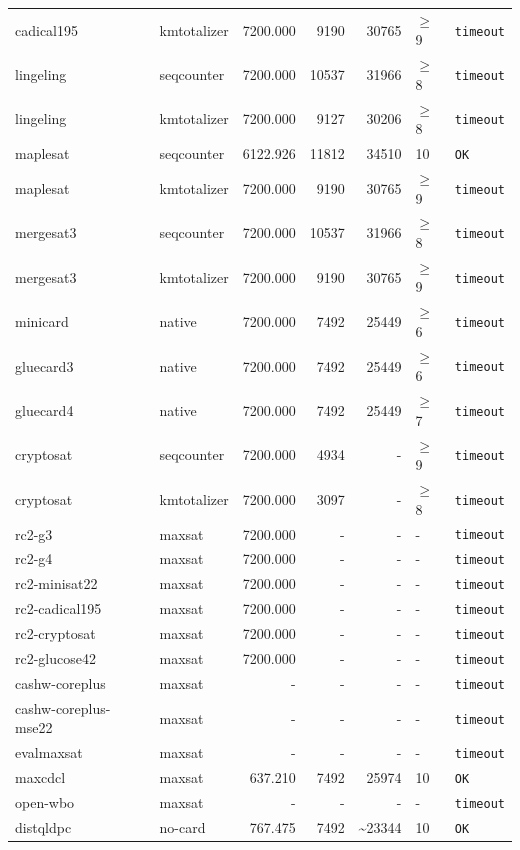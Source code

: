 \begin{longtable}{llrrrl p{}}
cadical195 & kmtotalizer & 7200.000 & 9190 & 30765 & $\geq$9 & \texttt{timeout} \\
lingeling & seqcounter & 7200.000 & 10537 & 31966 & $\geq$8 & \texttt{timeout} \\
lingeling & kmtotalizer & 7200.000 & 9127 & 30206 & $\geq$8 & \texttt{timeout} \\
maplesat & seqcounter & 6122.926 & 11812 & 34510 & 10 & \texttt{OK} \\
maplesat & kmtotalizer & 7200.000 & 9190 & 30765 & $\geq$9 & \texttt{timeout} \\
mergesat3 & seqcounter & 7200.000 & 10537 & 31966 & $\geq$8 & \texttt{timeout} \\
mergesat3 & kmtotalizer & 7200.000 & 9190 & 30765 & $\geq$9 & \texttt{timeout} \\
minicard & native & 7200.000 & 7492 & 25449 & $\geq$6 & \texttt{timeout} \\
gluecard3 & native & 7200.000 & 7492 & 25449 & $\geq$6 & \texttt{timeout} \\
gluecard4 & native & 7200.000 & 7492 & 25449 & $\geq$7 & \texttt{timeout} \\
cryptosat & seqcounter & 7200.000 & 4934 & - & $\geq$9 & \texttt{timeout} \\
cryptosat & kmtotalizer & 7200.000 & 3097 & - & $\geq$8 & \texttt{timeout} \\
rc2-g3 & maxsat & 7200.000 & - & - & - & \texttt{timeout} \\
rc2-g4 & maxsat & 7200.000 & - & - & - & \texttt{timeout} \\
rc2-minisat22 & maxsat & 7200.000 & - & - & - & \texttt{timeout} \\
rc2-cadical195 & maxsat & 7200.000 & - & - & - & \texttt{timeout} \\
rc2-cryptosat & maxsat & 7200.000 & - & - & - & \texttt{timeout} \\
rc2-glucose42 & maxsat & 7200.000 & - & - & - & \texttt{timeout} \\
cashw-coreplus & maxsat & - & - & - & - & \texttt{timeout} \\
cashw-coreplus-mse22 & maxsat & - & - & - & - & \texttt{timeout} \\
evalmaxsat & maxsat & - & - & - & - & \texttt{timeout} \\
maxcdcl & maxsat & 637.210 & 7492 & 25974 & 10 & \texttt{OK} \\
open-wbo & maxsat & - & - & - & - & \texttt{timeout} \\
distqldpc & no-card & 767.475 & 7492 & \textasciitilde{}23344 & 10 & \texttt{OK} \\

\end{longtable}
